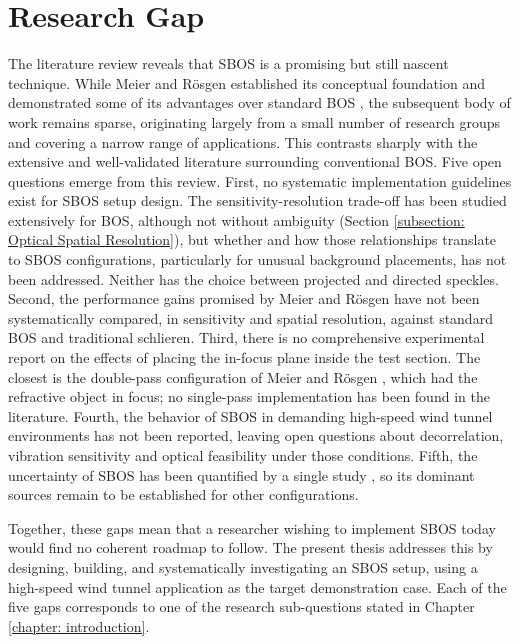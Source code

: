 \section{Research Gap}
\label{section: Research Gap}

\par The literature review reveals that SBOS is a promising but still nascent technique. While Meier and Rösgen established its conceptual foundation and demonstrated some of its advantages over standard BOS \cite{Meier&Roesgen2013}, the subsequent body of work remains sparse, originating largely from a small number of research groups and covering a narrow range of applications. This contrasts sharply with the extensive and well-validated literature surrounding conventional BOS. Five open questions emerge from this review. First, no systematic implementation guidelines exist for SBOS setup design. The sensitivity-resolution trade-off has been studied extensively for BOS, although not without ambiguity (Section \ref{subsection: Optical Spatial Resolution}), but whether and how those relationships translate to SBOS configurations, particularly for unusual background placements, has not been addressed. Neither has the choice between projected and directed speckles. Second, the performance gains promised by Meier and Rösgen have not been systematically compared, in sensitivity and spatial resolution, against standard BOS and traditional schlieren. Third, there is no comprehensive experimental report on the effects of placing the in-focus plane inside the test section. The closest is the double-pass configuration of Meier and Rösgen \cite{Meier&Roesgen2013}, which had the refractive object in focus; no single-pass implementation has been found in the literature. Fourth, the behavior of SBOS in demanding high-speed wind tunnel environments has not been reported, leaving open questions about decorrelation, vibration sensitivity and optical feasibility under those conditions. Fifth, the uncertainty of SBOS has been quantified by a single study \cite{Michalski2018}, so its dominant sources remain to be established for other configurations.

\par Together, these gaps mean that a researcher wishing to implement SBOS today would find no coherent roadmap to follow. The present thesis addresses this by designing, building, and systematically investigating an SBOS setup, using a high-speed wind tunnel application as the target demonstration case. Each of the five gaps corresponds to one of the research sub-questions stated in Chapter \ref{chapter: introduction}.